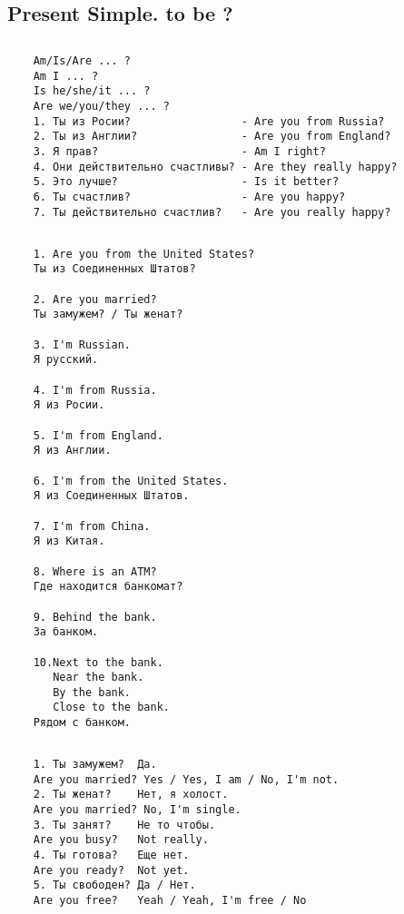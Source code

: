 \subsection{Present Simple. to be ?}
\subsection*{}
\begin{verbatim}
    Am/Is/Are ... ?
    Am I ... ?
    Is he/she/it ... ?
    Are we/you/they ... ?
    1. Ты из Росии?                 - Are you from Russia?
    2. Ты из Англии?                - Are you from England?
    3. Я прав?                      - Am I right?
    4. Они действительно счастливы? - Are they really happy?
    5. Это лучше?                   - Is it better?
    6. Ты счастлив?                 - Are you happy?
    7. Ты действительно счастлив?   - Are you really happy?
\end{verbatim}

\subsection*{}
\begin{verbatim}
    1. Are you from the United States?
    Ты из Соединенных Штатов?

    2. Are you married?
    Ты замужем? / Ты женат?

    3. I'm Russian.
    Я русский.

    4. I'm from Russia.
    Я из Росии.

    5. I'm from England.
    Я из Англии.

    6. I'm from the United States.
    Я из Соединенных Штатов.

    7. I'm from China.
    Я из Китая.

    8. Where is an ATM?
    Где находится банкомат?

    9. Behind the bank.
    За банком.

    10.Next to the bank.
       Near the bank.
       By the bank.
       Close to the bank.
    Рядом с банком.
\end{verbatim}

\subsection*{}
\begin{verbatim}
    1. Ты замужем?  Да.
    Are you married? Yes / Yes, I am / No, I'm not.
    2. Ты женат?    Нет, я холост.
    Are you married? No, I'm single.
    3. Ты занят?    Не то чтобы.
    Are you busy?   Not really.
    4. Ты готова?   Еще нет.
    Are you ready?  Not yet.
    5. Ты свободен? Да / Нет.
    Are you free?   Yeah / Yeah, I'm free / No
\end{verbatim}

